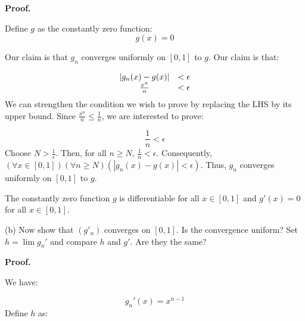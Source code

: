 \documentclass[10pt]{article}
\begin{document}
\textbf{Proof.}



Define $\displaystyle g$ as the constantly zero function:
\begin{equation*}
g( x) =0
\end{equation*}


Our claim is that $\displaystyle g_{n}$ converges uniformly on $\displaystyle [ 0,1]$ to $\displaystyle g$. Our claim is that:


\begin{equation*}
\begin{array}{ c c }
|g_{n}( x) -g( x) | & < \epsilon \\
\frac{x^{n}}{n} & < \epsilon 
\end{array}
\end{equation*}
We can strengthen the condition we wish to prove by replacing the LHS by its upper bound. Since $\displaystyle \frac{x^{n}}{n} \leq \frac{1}{n}$, we are interested to prove:


\begin{equation*}
\frac{1}{n} < \epsilon 
\end{equation*}
Choose $\displaystyle N >\frac{1}{\epsilon }$. Then, for all $\displaystyle n\geq N$, $\displaystyle \frac{1}{n} < \epsilon $. Consequently, $\displaystyle ( \forall x\in [ 0,1])( \forall n\geq N)( |g_{n}( x) -g( x) |< \epsilon )$. Thus, $\displaystyle g_{n}$ converges uniformly on $\displaystyle [ 0,1]$ to $\displaystyle g$.



The constantly zero function $\displaystyle g$ is differentiable for all $\displaystyle x\in [ 0,1]$ and $\displaystyle g'( x) =0$ for all $\displaystyle x\in [ 0,1]$.



(b) Now show that $\displaystyle ( g'_{n})$ converges on $\displaystyle [ 0,1]$. Is the convergence uniform? Set $\displaystyle h=\lim g_{n} '$ and compare $\displaystyle h$ and $\displaystyle g'$. Are they the same?



\textbf{Proof.}



We have:


\begin{equation*}
g_{n} '( x) =x^{n-1}
\end{equation*}
Define $\displaystyle h$ as:
\end{document}
